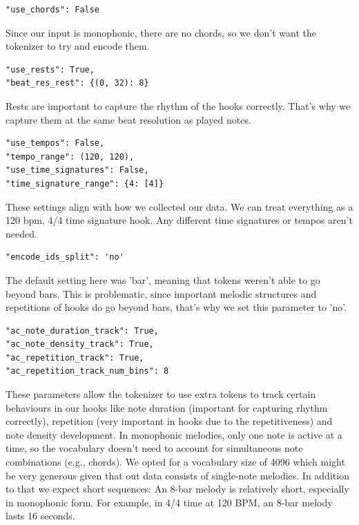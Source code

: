 \documentclass[a4paper,12pt]{extarticle}
\begin{document}
\begin{lstlisting}
"use_chords": False
\end{lstlisting}
Since our input is monophonic, there are no chords, so we don't want the tokenizer to try and encode them. \newline

\begin{lstlisting}
"use_rests": True,
"beat_res_rest": {(0, 32): 8}
\end{lstlisting}
Rests are important to capture the rhythm of the hooks correctly. That's why we capture them at the same beat resolution as played notes. \newline

\begin{lstlisting}
"use_tempos": False,
"tempo_range": (120, 120),
"use_time_signatures": False,
"time_signature_range": {4: [4]}
\end{lstlisting}
These settings align with how we collected our data. We can treat everything as a 120 bpm, 4/4 time signature hook. Any different time signatures or tempos aren't needed. \newline

\begin{lstlisting}
"encode_ids_split": 'no'
\end{lstlisting}
The default setting here was 'bar', meaning that tokens weren't able to go beyond bars. This is problematic, since important melodic structures and repetitions of hooks do go beyond bars, that's why we set this parameter to 'no'. \newline

\begin{lstlisting}
"ac_note_duration_track": True,
"ac_note_density_track": True,
"ac_repetition_track": True,
"ac_repetition_track_num_bins": 8
\end{lstlisting}
These parameters allow the tokenizer to use extra tokens to track certain behaviours in our hooks like note duration (important for capturing rhythm correctly), repetition (very important in hooks due to the repetitiveness) and note density development.
In monophonic melodies, only one note is active at a time, so the vocabulary doesn’t need to account for simultaneous note combinations (e.g., chords).
We opted for a vocabulary size of 4096 which might be very generous given that out data consists of single-note melodies.
In addition to that we expect short sequences: An 8-bar melody is relatively short, especially in monophonic form. For example, in 4/4 time at 120 BPM, an 8-bar melody lasts 16 seconds.
\end{document}
